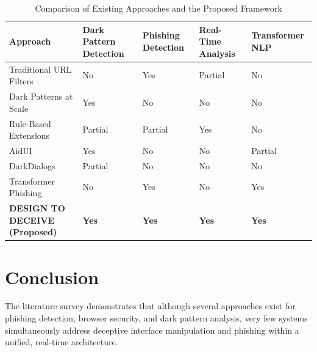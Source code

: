 \begin{table}[H]
\centering
\caption{Comparison of Existing Approaches and the Proposed Framework}
\vspace{0.1cm}
\renewcommand{\arraystretch}{1.3}
\begin{tabularx}{\textwidth}{|>{\raggedright\arraybackslash}p{3.2cm}|>{\centering\arraybackslash}X|>{\centering\arraybackslash}X|>{\centering\arraybackslash}X|>{\centering\arraybackslash}X|}
\hline
\textbf{Approach} &
\textbf{Dark Pattern Detection} &
\textbf{Phishing Detection} &
\textbf{Real-Time Analysis} &
\textbf{Transformer NLP} \\
\hline

Traditional URL Filters \cite{narayanan2020} &
No &
Yes &
Partial &
No \\
\hline

Dark Patterns at Scale \cite{mathur2019} &
Yes &
No &
No &
No \\
\hline

Rule-Based Extensions &
Partial &
Partial &
Yes &
No \\
\hline

AidUI \cite{aidui2023} &
Yes &
No &
No &
Partial \\
\hline

DarkDialogs \cite{darkdialogs2023} &
Partial &
No &
No &
No \\
\hline

Transformer Phishing \cite{phishing2024} &
No &
Yes &
No &
Yes \\
\hline

\textbf{DESIGN TO DECEIVE (Proposed)} &
\textbf{Yes} &
\textbf{Yes} &
\textbf{Yes} &
\textbf{Yes} \\
\hline

\end{tabularx}
\end{table}


\section{Conclusion}

The literature survey demonstrates that although several approaches exist for phishing detection, browser security, and dark pattern analysis, very few systems simultaneously address deceptive interface manipulation and phishing within a unified, real-time architecture.

